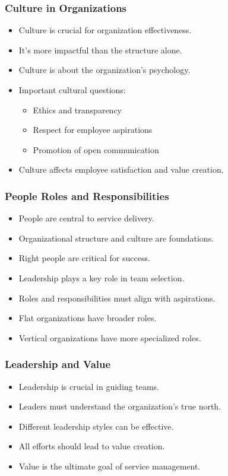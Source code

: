 \documentclass[aspectratio=169, table]{beamer}
\begin{document}
\begin{frame}
	\frametitle{Culture in Organizations}
	\begin{itemize}
		\item Culture is crucial for organization effectiveness.
		\item It's more impactful than the structure alone.
		\item Culture is about the organization's psychology.
		\item Important cultural questions:
		\begin{itemize}
			\item Ethics and transparency
			\item Respect for employee aspirations
			\item Promotion of open communication
		\end{itemize}
		\item Culture affects employee satisfaction and value creation.
	\end{itemize}
\end{frame}

\begin{frame}
	\frametitle{People Roles and Responsibilities}
	\begin{itemize}
		\item People are central to service delivery.
		\item Organizational structure and culture are foundations.
		\item Right people are critical for success.
		\item Leadership plays a key role in team selection.
		\item Roles and responsibilities must align with aspirations.
		\item Flat organizations have broader roles.
		\item Vertical organizations have more specialized roles.
	\end{itemize}
\end{frame}

\begin{frame}
	\frametitle{Leadership and Value}
	\begin{itemize}
		\item Leadership is crucial in guiding teams.
		\item Leaders must understand the organization's true north.
		\item Different leadership styles can be effective.
		\item All efforts should lead to value creation.
		\item Value is the ultimate goal of service management.
	\end{itemize}
\end{frame}
\end{document}
